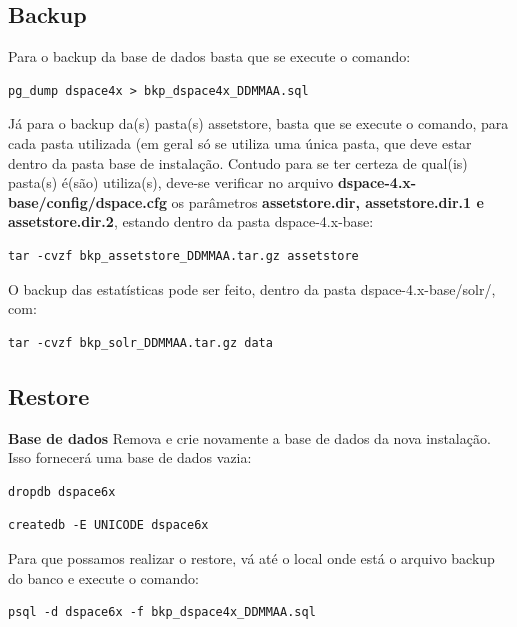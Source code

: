 \documentclass[12pt,hidelinks]{article}
\begin{document}
\subsection{Backup}
Para o backup da base de dados basta que se execute o comando:

\begin{verbatim}
pg_dump dspace4x > bkp_dspace4x_DDMMAA.sql
\end{verbatim}

Já para o backup da(s) pasta(s) assetstore, basta que se execute o comando, para cada pasta utilizada (em geral só se utiliza uma única pasta, que deve estar dentro da pasta base de instalação. Contudo para se ter certeza de qual(is) pasta(s) é(são) utiliza(s), deve-se verificar no arquivo \textbf{dspace-4.x-base/config/dspace.cfg} os parâmetros \textbf{assetstore.dir, assetstore.dir.1 e assetstore.dir.2}, estando dentro da pasta dspace-4.x-base:   

\begin{verbatim}
tar -cvzf bkp_assetstore_DDMMAA.tar.gz assetstore
\end{verbatim}

O backup das estatísticas pode ser feito, dentro da pasta dspace-4.x-base/solr/, com:

\begin{verbatim}
tar -cvzf bkp_solr_DDMMAA.tar.gz data
\end{verbatim}

\subsection{Restore}

\textbf{Base de dados}
\singlespacing
\textbullet \hspace{6pt} Remova e crie novamente a base de dados da nova instalação. Isso fornecerá uma base de dados vazia:

\begin{verbatim}
dropdb dspace6x
\end{verbatim}

\begin{verbatim}
createdb -E UNICODE dspace6x
\end{verbatim}

\textbullet \hspace{6pt} Para que possamos realizar o restore, vá até o local onde está o arquivo backup do banco e execute o comando:

\begin{verbatim}
psql -d dspace6x -f bkp_dspace4x_DDMMAA.sql
\end{verbatim}
\end{document}
